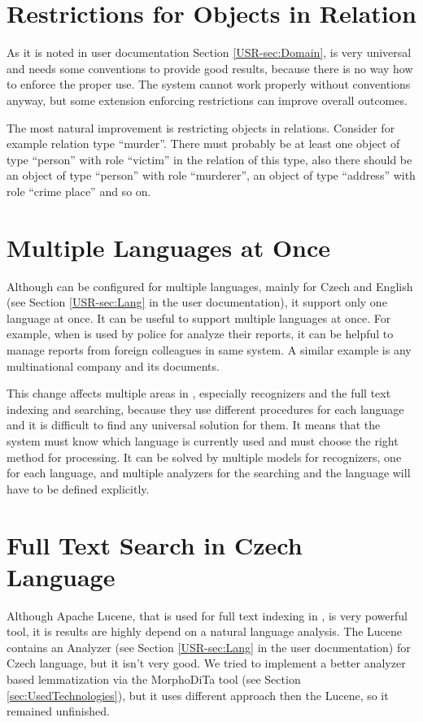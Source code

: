 \section{Restrictions for Objects in Relation}
As it is noted in user documentation Section \ref{USR-sec:Domain},
\textan{} is very universal and needs some conventions to provide good results,
because there is no way how to enforce the proper use. The system cannot work
properly without conventions anyway, but some extension enforcing restrictions
can improve overall outcomes.

The most natural improvement is restricting objects in relations. Consider for
example relation type ``murder''. There must probably be at least one object of
type ``person'' with role ``victim'' in the relation of this type, also there
should be an object of type ``person'' with role ``murderer'', an object of type
``address'' with role ``crime place'' and so on.

\section{Multiple Languages at Once}
Although \textan{} can be configured for multiple languages, mainly for Czech
and English (see Section \ref{USR-sec:Lang} in the user documentation), it
support only one language at once. It can be useful to support multiple
languages at once. For example, when \textan{} is used by police for analyze
their reports, it can be helpful to manage reports from foreign colleagues in
same system. A similar example is any multinational company and its documents.

This change affects multiple areas in \textan{}, especially recognizers and
the full text indexing and searching, because they use different procedures for
each language and it is difficult to find any universal solution for them. It
means that the system must know which language is currently used and must choose
the right method for processing. It can be solved by multiple models for
recognizers, one for each language, and multiple analyzers for the searching and
the language will have to be defined explicitly.

\section{Full Text Search in Czech Language}

Although Apache Lucene, that is used for full text indexing in \textan, is very
powerful tool, it is results are highly depend on a natural language analysis.
The Lucene contains an Analyzer (see Section \ref{USR-sec:Lang} in the user documentation)
for Czech language, but it isn't very good. We tried to implement a better analyzer
based lemmatization via the MorphoDiTa tool (see Section \ref{sec:UsedTechnologies}),
but it uses different approach then the Lucene, so it remained unfinished.


